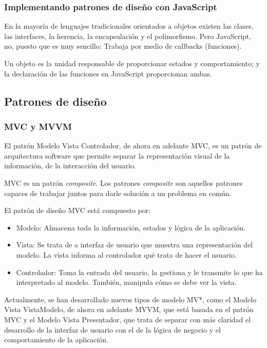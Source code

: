 \subsubsection{Implementando patrones de diseño con JavaScript}
En la mayoría de lenguajes tradicionales orientados a objetos existen las clases, las interfaces, la herencia, la encapsulación y el polimorfismo. Pero JavaScript, no, puesto que es muy sencillo: Trabaja por medio de callbacks (funciones).


Un objeto es la unidad responsable de proporcionar estados y comportamiento; y la declaración de las funciones en JavaScript proporcionan ambas\cite{angular_embrace}.


\subsection{Patrones de diseño}
\subsubsection{MVC y MVVM}
El patrón Modelo Vista Controlador, de ahora en adelante MVC, es un patrón de arquitectura software que permite separar la representación visual de la información, de la interacción del usuario. 


MVC es un patrón \textit{composite}. Los patrones \textit{composite} son aquellos patrones capaces de trabajar juntos para darle solución a un problema en común\cite{ericfreemanelisabethfreemanbertbates2004}. 


El patrón de diseño MVC está compuesto por:


\begin{itemize}
\item Modelo: Almacena toda la información, estados y lógica de la aplicación.
\item Vista: Se trata de a interfaz de usuario que muestra una representación del modelo. La vista informa al controlador qué trata de hacer el usuario. 
\item Controlador: Toma la entrada del usuario, la gestiona y le transmite lo que ha interpretado al modelo. También, manipula cómo se debe ver la vista.
\end{itemize}


Actualmente, se han desarrollado nuevos tipos de modelo MV*, como el Modelo Vista VistaModelo, de ahora en adelante MVVM, que está basada en el patrón MVC y el Modelo Vista Presentador, que trata de separar con más claridad el desarrollo de la interfaz de usuario con el de la lógica de negocio y el comportamiento de la aplicación.


